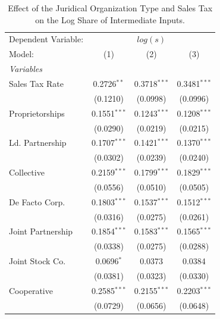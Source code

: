 \documentclass[
  12pt]{article}
\theoremstyle{definition}
\theoremstyle{remark}
\begin{document}
\begin{table}

\caption{\label{tbl-reg-jo-tax}Effect of the Juridical Organization Type
and Sales Tax on the Log Share of Intermediate Inputs.}

\begin{minipage}{\linewidth}

\begingroup
\centering
\begin{tabular}{lccc}
   \tabularnewline \midrule \midrule
   Dependent Variable: & \multicolumn{3}{c}{\(log(s)\)}\\
   Model:            & (1)            & (2)             & (3)\\  
   \midrule
   \emph{Variables}\\
   Sales Tax Rate    & 0.2726$^{**}$  & 0.3718$^{***}$  & 0.3481$^{***}$\\   
                     & (0.1210)       & (0.0998)        & (0.0996)\\   
   Proprietorships   & 0.1551$^{***}$ & 0.1243$^{***}$  & 0.1208$^{***}$\\   
                     & (0.0290)       & (0.0219)        & (0.0215)\\   
   Ld. Partnership   & 0.1707$^{***}$ & 0.1421$^{***}$  & 0.1370$^{***}$\\   
                     & (0.0302)       & (0.0239)        & (0.0240)\\   
   Collective        & 0.2159$^{***}$ & 0.1799$^{***}$  & 0.1829$^{***}$\\   
                     & (0.0556)       & (0.0510)        & (0.0505)\\   
   De Facto Corp.    & 0.1803$^{***}$ & 0.1537$^{***}$  & 0.1512$^{***}$\\   
                     & (0.0316)       & (0.0275)        & (0.0261)\\   
   Joint Partnership & 0.1854$^{***}$ & 0.1583$^{***}$  & 0.1565$^{***}$\\   
                     & (0.0338)       & (0.0275)        & (0.0288)\\   
   Joint Stock Co.   & 0.0696$^{*}$   & 0.0373          & 0.0384\\   
                     & (0.0381)       & (0.0323)        & (0.0330)\\   
   Cooperative       & 0.2585$^{***}$ & 0.2155$^{***}$  & 0.2203$^{***}$\\   
                     & (0.0729)       & (0.0656)        & (0.0648)\\   

\end{tabular}
\end{minipage}
\end{table}
\end{document}
